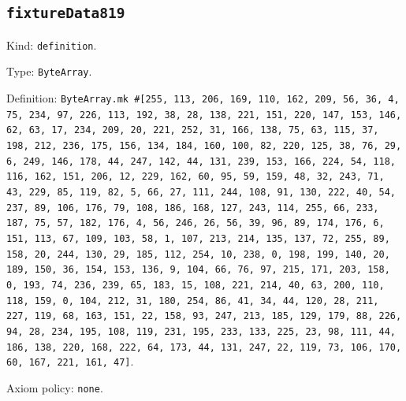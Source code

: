 \documentclass[11pt]{article}
\begin{document}
\subsection*{\texttt{fixtureData819}}
\noindent Kind: \texttt{definition}.\par
\noindent Type: \texttt{ByteArray}.\par
\noindent Definition: \texttt{ByteArray.mk \#[255, 113, 206, 169, 110, 162, 209, 56, 36, 4, 75, 234, 97, 226, 113, 192, 38, 28, 138, 221, 151, 220, 147, 153, 146, 62, 63, 17, 234, 209, 20, 221, 252, 31, 166, 138, 75, 63, 115, 37, 198, 212, 236, 175, 156, 134, 184, 160, 100, 82, 220, 125, 38, 76, 29, 6, 249, 146, 178, 44, 247, 142, 44, 131, 239, 153, 166, 224, 54, 118, 116, 162, 151, 206, 12, 229, 162, 60, 95, 59, 159, 48, 32, 243, 71, 43, 229, 85, 119, 82, 5, 66, 27, 111, 244, 108, 91, 130, 222, 40, 54, 237, 89, 106, 176, 79, 108, 186, 168, 127, 243, 114, 255, 66, 233, 187, 75, 57, 182, 176, 4, 56, 246, 26, 56, 39, 96, 89, 174, 176, 6, 151, 113, 67, 109, 103, 58, 1, 107, 213, 214, 135, 137, 72, 255, 89, 158, 20, 244, 130, 29, 185, 112, 254, 10, 238, 0, 198, 199, 140, 20, 189, 150, 36, 154, 153, 136, 9, 104, 66, 76, 97, 215, 171, 203, 158, 0, 193, 74, 236, 239, 65, 183, 15, 108, 221, 214, 40, 63, 200, 110, 118, 159, 0, 104, 212, 31, 180, 254, 86, 41, 34, 44, 120, 28, 211, 227, 119, 68, 163, 151, 22, 158, 93, 247, 213, 185, 129, 179, 88, 226, 94, 28, 234, 195, 108, 119, 231, 195, 233, 133, 225, 23, 98, 111, 44, 186, 138, 220, 168, 222, 64, 173, 44, 131, 247, 22, 119, 73, 106, 170, 60, 167, 221, 161, 47]}.\par
\noindent Axiom policy: \texttt{none}.\par
\end{document}
